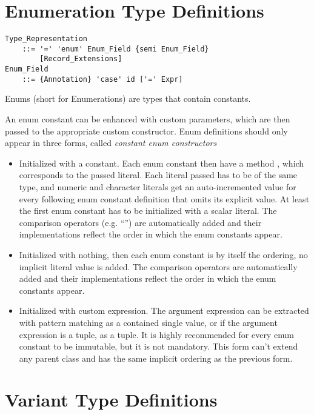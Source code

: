\section{Enumeration Type Definitions}
\label{sec:enums}

\grammar\begin{lstlisting}
Type_Representation
    ::= '=' 'enum' Enum_Field {semi Enum_Field}
        [Record_Extensions]
Enum_Field 
    ::= {Annotation} 'case' id ['=' Expr]
\end{lstlisting}

Enums (short for Enumerations) are types that contain constants.

An enum constant can be enhanced with custom parameters, which are then passed to the appropriate custom constructor. Enum definitions should only appear in three forms, called {\em constant enum constructors}
\begin{itemize}
  \item Initialized with a constant. Each enum constant then have a method , which corresponds to the passed literal. Each literal passed has to be of the same type, and numeric and character literals get an auto-incremented value for every following enum constant definition that omits its explicit value. At least the first enum constant has to be initialized with a scalar literal. The comparison operators (e.g. ``\code{<}'') are automatically added and their implementations reflect the order in which the enum constants appear.
  \item Initialized with nothing, then each enum constant is by itself the ordering, no implicit literal value is added. The comparison operators are automatically added and their implementations reflect the order in which the enum constants appear. 
  \item Initialized with custom expression. The argument expression can be extracted with pattern matching as a contained single value, or if the argument expression is a tuple, as a tuple. It is highly recommended for every enum constant to be immutable, but it is not mandatory. This form can't extend any parent class and has the same implicit ordering as the previous form. 
\end{itemize}





\section{Variant Type Definitions}
\label{sec:variant-types}


